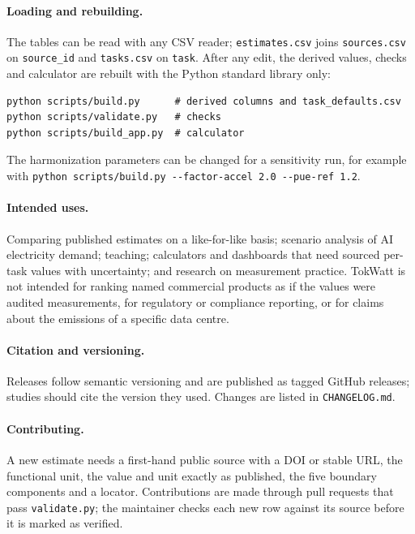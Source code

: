 \documentclass[11pt]{article}
\newcommand{\file}[1]{\texttt{#1}}
\begin{document}
\paragraph{Loading and rebuilding.}
The tables can be read with any CSV reader; \file{estimates.csv} joins \file{sources.csv} on \file{source\_id} and \file{tasks.csv} on \file{task}. After any edit, the derived values, checks and calculator are rebuilt with the Python standard library only:
\par\noindent\begin{minipage}{\linewidth}\small
\begin{verbatim}
python scripts/build.py      # derived columns and task_defaults.csv
python scripts/validate.py   # checks
python scripts/build_app.py  # calculator
\end{verbatim}
\end{minipage}\par\smallskip
\noindent The harmonization parameters can be changed for a sensitivity run, for example with \verb|python scripts/build.py --factor-accel 2.0 --pue-ref 1.2|.

\paragraph{Intended uses.}
Comparing published estimates on a like-for-like basis; scenario analysis of AI electricity demand; teaching; calculators and dashboards that need sourced per-task values with uncertainty; and research on measurement practice. TokWatt is not intended for ranking named commercial products as if the values were audited measurements, for regulatory or compliance reporting, or for claims about the emissions of a specific data centre.

\paragraph{Citation and versioning.}
Releases follow semantic versioning and are published as tagged GitHub releases; studies should cite the version they used. Changes are listed in \file{CHANGELOG.md}.

\paragraph{Contributing.}
A new estimate needs a first-hand public source with a DOI or stable URL, the functional unit, the value and unit exactly as published, the five boundary components and a locator. Contributions are made through pull requests that pass \file{validate.py}; the maintainer checks each new row against its source before it is marked as verified.
\end{document}
